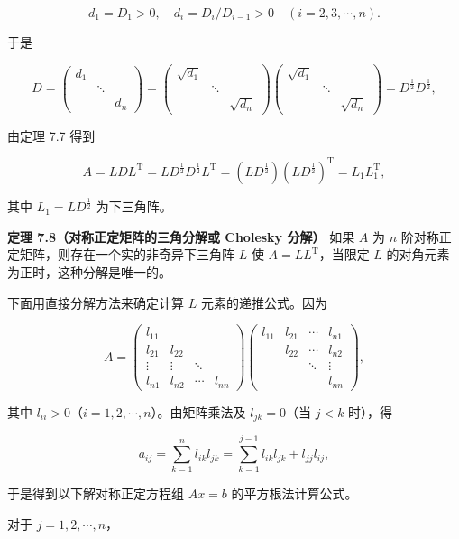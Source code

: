 \documentclass[
  10pt,
  fontset=fandol]{ctexart}
\begin{document}
\[d_1=D_1>0,\quad d_i=D_i/D_{i-1}>0\quad(i=2,3,\cdots,n).\]

于是

\[
D=\begin{pmatrix}d_1&&\\&\ddots&\\&&d_n\end{pmatrix}
=\begin{pmatrix}\sqrt{d_1}&&\\&\ddots&\\&&\sqrt{d_n}\end{pmatrix}
\begin{pmatrix}\sqrt{d_1}&&\\&\ddots&\\&&\sqrt{d_n}\end{pmatrix}
=D^{\frac12}D^{\frac12},
\]

由定理 7.7 得到

\[A=LDL^{\mathrm T}=LD^{\frac12}D^{\frac12}L^{\mathrm T}=(LD^{\frac12})(LD^{\frac12})^{\mathrm T}=L_1L_1^{\mathrm T},\]

其中 \(L_1=LD^{\frac12}\) 为下三角阵。

\textbf{定理 7.8（对称正定矩阵的三角分解或 Cholesky 分解）} 如果 \(A\) 为 \(n\) 阶对称正定矩阵，则存在一个实的非奇异下三角阵 \(L\) 使 \(A=LL^{\mathrm T}\)，当限定 \(L\) 的对角元素为正时，这种分解是唯一的。

下面用直接分解方法来确定计算 \(L\) 元素的递推公式。因为

\[
A=\begin{pmatrix}
l_{11}&&&\\
l_{21}&l_{22}&&\\
\vdots&\vdots&\ddots&\\
l_{n1}&l_{n2}&\cdots&l_{nn}
\end{pmatrix}
\begin{pmatrix}
l_{11}&l_{21}&\cdots&l_{n1}\\
&l_{22}&\cdots&l_{n2}\\
&&\ddots&\vdots\\
&&&l_{nn}
\end{pmatrix},
\]

其中 \(l_{ii}>0\)（\(i=1,2,\cdots,n\)）。由矩阵乘法及 \(l_{jk}=0\)（当 \(j<k\) 时），得

\[a_{ij}=\sum_{k=1}^{n}l_{ik}l_{jk}=\sum_{k=1}^{j-1}l_{ik}l_{jk}+l_{jj}l_{ij},\]

于是得到以下解对称正定方程组 \(Ax=b\) 的平方根法计算公式。

对于 \(j=1,2,\cdots,n\)，
\end{document}
